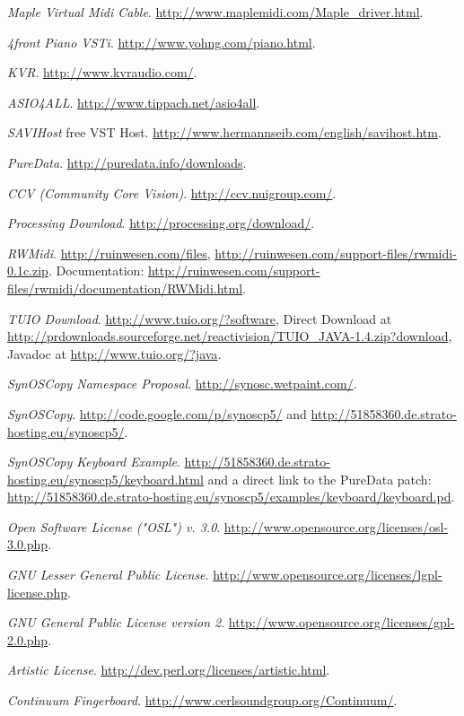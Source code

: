 \documentclass[12pt,a4paper,titlepage,oneside]{report}
\begin{document}
\begin{thebibliography}{99}
  \emph{Maple Virtual Midi Cable}.
  \url{http://www.maplemidi.com/Maple_driver.html}.
  
  \emph{4front Piano VSTi}.
  \url{http://www.yohng.com/piano.html}.
  
  \emph{KVR}.
  \url{http://www.kvraudio.com/}.
  
  \emph{ASIO4ALL}.
  \url{http://www.tippach.net/asio4all}.
  
  \emph{SAVIHost} free VST Host.
  \url{http://www.hermannseib.com/english/savihost.htm}.
  
  \emph{PureData}.
  \url{http://puredata.info/downloads}.
  
  \emph{CCV (Community Core Vision)}.
  \url{http://ccv.nuigroup.com/}.

  \emph{Processing Download}.
  \url{http://processing.org/download/}.
  
  \emph{RWMidi}.
  \url{http://ruinwesen.com/files}, \url{http://ruinwesen.com/support-files/rwmidi-0.1c.zip}.
  Documentation: \url{http://ruinwesen.com/support-files/rwmidi/documentation/RWMidi.html}.

  \emph{TUIO Download}.
  \url{http://www.tuio.org/?software}, Direct Download at \url{http://prdownloads.sourceforge.net/reactivision/TUIO_JAVA-1.4.zip?download}, Javadoc at \url{http://www.tuio.org/?java}.
  
  \emph{SynOSCopy Namespace Proposal}.
  \url{http://synosc.wetpaint.com/}.

  \emph{SynOSCopy}.
  \url{http://code.google.com/p/synoscp5/} and \url{http://51858360.de.strato-hosting.eu/synoscp5/}.
  
  \emph{SynOSCopy Keyboard Example}.
  \url{http://51858360.de.strato-hosting.eu/synoscp5/keyboard.html} and a direct link to the PureData patch: \url{http://51858360.de.strato-hosting.eu/synoscp5/examples/keyboard/keyboard.pd}.
  
  \emph{Open Software License ("OSL") v. 3.0}.
  \url{http://www.opensource.org/licenses/osl-3.0.php}.

  \emph{GNU Lesser General Public License}.
  \url{http://www.opensource.org/licenses/lgpl-license.php}.

  \emph{GNU General Public License version 2}.
  \url{http://www.opensource.org/licenses/gpl-2.0.php}.
  
  \emph{Artistic License}.
  \url{http://dev.perl.org/licenses/artistic.html}.

  \emph{Continuum Fingerboard}.
  \url{http://www.cerlsoundgroup.org/Continuum/}.

\end{thebibliography}
\end{document}
